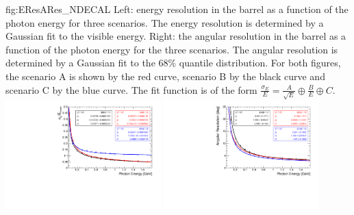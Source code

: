 \begin{dunefigure}{fig:EResARes_NDECAL}
{Left: energy resolution in the barrel as a function of the photon energy for three  scenarios. The energy resolution is determined by a Gaussian fit to the visible energy. Right: the angular resolution in the barrel as a function of the photon energy for the three  scenarios. The angular resolution is determined by a Gaussian fit to the 68\% quantile distribution. For both figures, the scenario A is shown by the red curve, scenario B by the black curve and scenario C by the blue curve. The fit function is of the form $\frac{\sigma_{E}}{E} = \frac{A}{\sqrt{E}} \oplus \frac{B}{E} \oplus C$.}
\includegraphics[width=0.45\textwidth]{graphics/Comparison_Setups_EnergyResolution.pdf}
\includegraphics[width=0.45\textwidth]{graphics/Comparison_Setups_AngularResolution.pdf}
\end{dunefigure}


